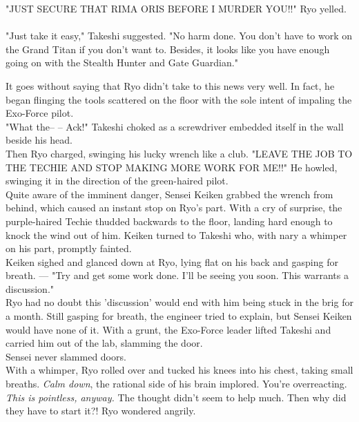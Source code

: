 \documentclass[11pt,twoside,a4paper]{book}
\begin{document}
\begin{multicols*}{2}
"JUST SECURE THAT RIMA ORIS BEFORE I MURDER YOU!!" Ryo yelled. ~\\

"Just take it easy," Takeshi suggested. "No harm done. You don't have to work on the Grand Titan if you don't want to. Besides, it looks like you have enough going on with the Stealth Hunter and Gate Guardian." %


It goes without saying that Ryo didn't take to this news very well. In fact, he began flinging the tools scattered on the floor with the sole intent of impaling the Exo-Force pilot. ~\\

"What the-- -- Ack!" Takeshi choked as a screwdriver embedded itself in the wall beside his head. ~\\

Then Ryo charged, swinging his lucky wrench like a club. "LEAVE THE JOB TO THE TECHIE AND STOP MAKING MORE WORK FOR ME!!" He howled, swinging it in the direction of the green-haired pilot. ~\\

Quite aware of the imminent danger, Sensei Keiken grabbed the wrench from behind, which caused an instant stop on Ryo's part. With a cry of surprise, the purple-haired Techie thudded backwards to the floor, landing hard enough to knock the wind out of him. Keiken turned to Takeshi who, with nary a whimper on his part, promptly fainted. ~\\

Keiken sighed and glanced down at Ryo, lying flat on his back and gasping for breath. --- "Try and get some work done. I'll be seeing you soon. This warrants a discussion." ~\\

Ryo had no doubt this 'discussion' would end with him being stuck in the brig for a month. Still gasping for breath, the engineer tried to explain, but Sensei Keiken would have none of it. With a grunt, the Exo-Force leader lifted Takeshi and carried him out of the lab, slamming the door. ~\\

Sensei never slammed doors. ~\\

With a whimper, Ryo rolled over and tucked his knees into his chest, taking small breaths. \emph{Calm down}, the rational side of his brain implored. You're overreacting. \emph{This is pointless, anyway.} The thought didn't seem to help much. Then why did they have to start it?! Ryo wondered angrily. ~\\


\end{multicols*}
\end{document}
